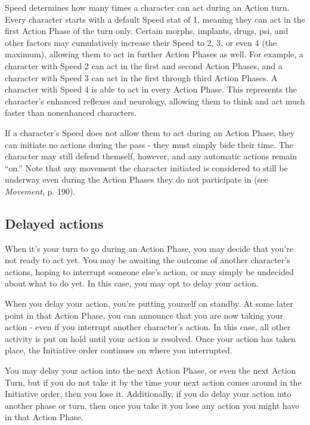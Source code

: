 Speed determines how many times a character can act during an Action turn. Every character starts with a default Speed stat of 1, meaning they can act in the first Action Phase of the turn only. Certain morphs, implants, drugs, psi, and other factors may cumulatively increase their Speed to 2, 3, or even 4 (the maximum), allowing them to act in further Action Phases as well. For example, a character with Speed 2 can act in the first and second Action Phases, and a character with Speed 3 can act in the first through third Action Phases. A character with Speed 4 is able to act in every Action Phase. This represents the character’s enhanced reflexes and neurology, allowing them to think and act much faster than nonenhanced characters.

If a character’s Speed does not allow them to act during an Action Phase, they can initiate no actions during the pass - they must simply bide their time. The character may still defend themself, however, and any automatic actions remain ``on.'' Note that any movement the character initiated is considered to still be underway even during the Action Phases they do not participate in (see \emph{Movement}, p. 190).


\subsection{Delayed actions}
\label{sec:delayed-actions}

When it’s your turn to go during an Action Phase, you may decide that you’re not ready to act yet. You may be awaiting the outcome of another character’s actions, hoping to interrupt someone else’s action, or may simply be undecided about what to do yet. In this case, you may opt to delay your action.

When you delay your action, you’re putting yourself on standby. At some later point in that Action Phase, you can announce that you are now taking your action - even if you interrupt another character’s action. In this case, all other activity is put on hold until your action is resolved. Once your action has taken place, the Initiative order continues on where you interrupted.

You may delay your action into the next Action Phase, or even the next Action Turn, but if you do not take it by the time your next action comes around in the Initiative order, then you lose it. Additionally, if you do delay your action into another phase or turn, then once you take it you lose any action you might have in that Action Phase.


